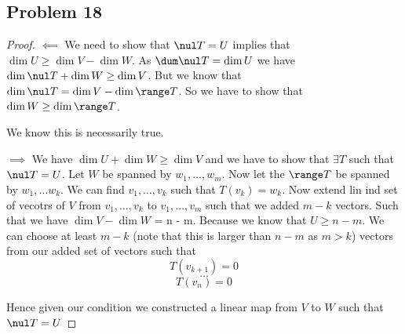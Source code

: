 \documentclass[a4paper]{report}
\begin{document}
\subsection*{Problem 18}
\begin{proof}
    $\impliedby$ 
    We need to show that $ \nul T = U$ implies that $\dim U \ge \dim V  - \dim W$. As $\dum \nul T = \dim U$ we have $\dim \nul T + \dim W \ge \dim V$. But we know that  $\dim \nul T = \dim V - \dim \range T$. So we have to show that  $\dim W \ge \dim \range T$.

    We know this is necessarily true.

    $\implies$
    We have  $\dim U + \dim W \ge \dim V$ and we have to show that $\exists T$ such that $\nul T = U$. Let $W$ be spanned by $w_1,\dots,w_m$. Now let the $\range T$ be spanned by $w_1,\dots w_k$. We can find $v_1,\dots,v_k$ such that $T(v_k) = w_k$. Now extend lin ind set of vecotrs of $V$ from $v_1,\dots,v_k$ to $v_1,\dots,v_m$ such that we added $m -k$ vectors. Such that we have $\dim V - \dim W $ = n - m. Because we know that $U \ge n - m$. We can choose at least $m - k$ (note that this is larger than $n -m$ as $m > k$) vectors from our added set of vectors such that  
$$ T(v_{k+1}) = 0 $$ 
$$ \dots $$ 
$$ T(v_{n}) = 0 $$ 

Hence given our condition we constructed a linear map from $V$ to $W$ such that $ \nul T = U$
\end{proof}
\end{document}
